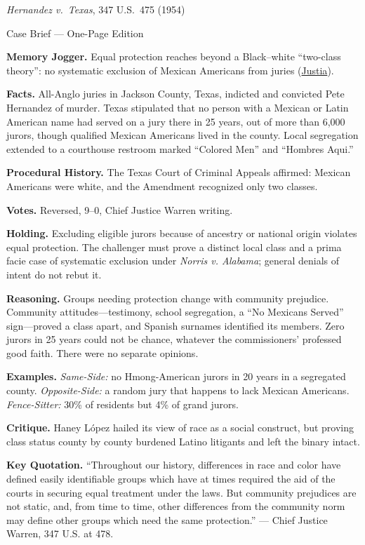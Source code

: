 \documentclass[12pt]{article}
\begin{document}
\begin{center}
{\Large \textit{Hernandez v.\ Texas}, 347 U.S.\ 475 (1954)\par}
\vspace{0.3em}
{\normalsize Case Brief --- One-Page Edition\par}
\end{center}

\textbf{Memory Jogger.} Equal protection reaches beyond a Black--white ``two-class theory'': no systematic exclusion of Mexican Americans from juries (\href{https://supreme.justia.com/cases/federal/us/347/475/}{Justia}).

\textbf{Facts.} All-Anglo juries in Jackson County, Texas, indicted and convicted Pete Hernandez of murder. Texas stipulated that no person with a Mexican or Latin American name had served on a jury there in 25 years, out of more than 6,000 jurors, though qualified Mexican Americans lived in the county. Local segregation extended to a courthouse restroom marked ``Colored Men'' and ``Hombres Aqui.''

\textbf{Procedural History.} The Texas Court of Criminal Appeals affirmed: Mexican Americans were white, and the Amendment recognized only two classes.

\textbf{Votes.} Reversed, 9--0, Chief Justice Warren writing.

\textbf{Holding.} Excluding eligible jurors because of ancestry or national origin violates equal protection. The challenger must prove a distinct local class and a prima facie case of systematic exclusion under \textit{Norris v. Alabama}; general denials of intent do not rebut it.

\textbf{Reasoning.} Groups needing protection change with community prejudice. Community attitudes---testimony, school segregation, a ``No Mexicans Served'' sign---proved a class apart, and Spanish surnames identified its members. Zero jurors in 25 years could not be chance, whatever the commissioners' professed good faith. There were no separate opinions.

\textbf{Examples.} \emph{Same-Side:} no Hmong-American jurors in 20 years in a segregated county. \emph{Opposite-Side:} a random jury that happens to lack Mexican Americans. \emph{Fence-Sitter:} 30\% of residents but 4\% of grand jurors.

\textbf{Critique.} Haney L\'{o}pez hailed its view of race as a social construct, but proving class status county by county burdened Latino litigants and left the binary intact.

\textbf{Key Quotation.} ``Throughout our history, differences in race and color have defined easily identifiable groups which have at times required the aid of the courts in securing equal treatment under the laws. But community prejudices are not static, and, from time to time, other differences from the community norm may define other groups which need the same protection.'' --- Chief Justice Warren, 347 U.S. at 478.
\end{document}
